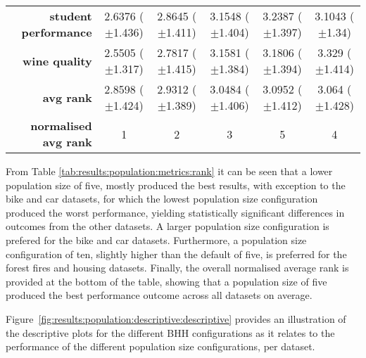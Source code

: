 \begin{table}[htb]
{\begin{tabular}{r|ccccc}
			\textbf{student performance} & \cellcolor[rgb]{ .388,  .745,  .482}2.6376 ($\pm$1.436) & \cellcolor[rgb]{ .682,  .827,  .498}2.8645 ($\pm$1.411) & \cellcolor[rgb]{ .992,  .733,  .482}3.1548 ($\pm$1.404) & \cellcolor[rgb]{ .973,  .412,  .42}3.2387 ($\pm$1.397)  & \cellcolor[rgb]{ 1,  .922,  .518}3.1043 ($\pm$1.34)     \\
			\textbf{wine quality}        & \cellcolor[rgb]{ .388,  .745,  .482}2.5505 ($\pm$1.317) & \cellcolor[rgb]{ .62,  .812,  .494}2.7817 ($\pm$1.415)  & \cellcolor[rgb]{ 1,  .922,  .518}3.1581 ($\pm$1.384)    & \cellcolor[rgb]{ 1,  .855,  .506}3.1806 ($\pm$1.394)    & \cellcolor[rgb]{ .973,  .412,  .42}3.329 ($\pm$1.414)   \\
			\midrule
			\textbf{avg rank}            & \cellcolor[rgb]{ .388,  .745,  .482}2.8598 ($\pm$1.424) & \cellcolor[rgb]{ .62,  .812,  .494}2.9312 ($\pm$1.389)  & \cellcolor[rgb]{ 1,  .922,  .518}3.0484 ($\pm$1.406)    & \cellcolor[rgb]{ .973,  .412,  .42}3.0952 ($\pm$1.412)  & \cellcolor[rgb]{ .992,  .753,  .486}3.064 ($\pm$1.428)  \\
			\midrule
			\textbf{normalised avg rank} & \cellcolor[rgb]{ .388,  .745,  .482}1                   & \cellcolor[rgb]{ .694,  .831,  .498}2                   & \cellcolor[rgb]{ 1,  .922,  .518}3                      & \cellcolor[rgb]{ .973,  .412,  .42}5                    & \cellcolor[rgb]{ .988,  .667,  .471}4                   \\
		\end{tabular}%

	}
\end{table}%

From Table \ref{tab:results:population:metrics:rank} it can be seen that a lower population size of five, mostly produced the best results, with exception to the bike and car datasets, for which the lowest population size configuration produced the worst performance, yielding statistically significant differences in outcomes from the other datasets. A larger population size configuration is prefered for the bike and car datasets. Furthermore, a population size configuration of ten, slightly higher than the default of five, is preferred for the forest fires and housing datasets. Finally, the overall normalised average rank is provided at the bottom of the table, showing that a population size of five produced the best performance outcome across all datasets on average.

Figure~\ref{fig:results:population:descriptive:descriptive} provides an illustration of the descriptive plots for the different \acs{BHH} configurations as it relates to the performance of the different population size configurations, per dataset.

